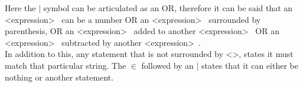 \onehalfspacing
\begin{bnf*}
		{}\\
		\\
		\\
		\\
\end{bnf*}
\\
Here the $|$ symbol can be articulated as an OR, therefore it can be said that an \textless expression\textgreater~ can be a number OR an \textless expression\textgreater~ surrounded by parenthesis, OR an \textless expression\textgreater~ added to another \textless expression\textgreater~ OR an \textless expression\textgreater~ subtracted by another \textless expression\textgreater~. 
\\
In addition to this, any statement that is not surrounded by \textless \textgreater, states it must match that particular string. The $\in$ followed by an $|$ states that it can either be nothing or another statement. \\
\\

